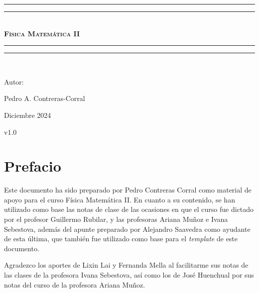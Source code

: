 \documentclass[letterpaper,12pt]{report}
\newlength{\drop}
\theoremstyle{definition}
\begin{document}
\begin{titlepage}
 \textheight
    \centering
    \vspace*{\baselineskip}
    \rule{\textwidth}{1.6pt}\vspace*{-\baselineskip}\vspace*{2pt}
    \rule{\textwidth}{0.4pt}\\[\baselineskip]
    {\scshape\bfseries\Huge{}\selectfont Física Matemática II} \\[0.2\baselineskip]
    \rule{\textwidth}{0.4pt}\vspace*{-\baselineskip}\vspace{3.2pt}
    \rule{\textwidth}{1.6pt}\\[\baselineskip]
    {\Large Autor: \par}
{\large Pedro A. Contreras-Corral \par}
\vfill
{\large Diciembre 2024 \par}
{\large v1.0 \par}
\end{titlepage}

\chapter*{Prefacio}

Este documento ha sido preparado por Pedro Contreras Corral como material de apoyo para el curso Física Matemática II. En cuanto a su contenido, se han utilizado como base las notas de clase de las ocasiones en que el curso fue dictado por el profesor Guillermo Rubilar, y las profesoras Ariana Muñoz e Ivana Sebestova, además del apunte preparado por Alejandro Saavedra como ayudante de esta última, que también fue utilizado como base para el \emph{template} de este documento.


Agradezco los aportes de Lixin Lai y Fernanda Mella al facilitarme sus notas de las clases de la profesora Ivana Sebestova, así como los de José Huenchual por sus notas del curso de la profesora Ariana Muñoz.

\tableofcontents


% 







% 

\appendix




\nocite{*} %
\printbibliography[title={Referencias}]
\end{document}
